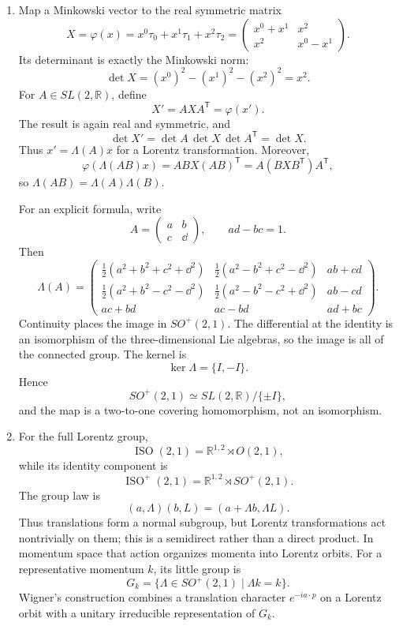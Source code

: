 \begin{enumerate}
\begin{enumerate}
\item[(b)] Map a Minkowski vector to the real symmetric matrix
\[
 X=\varphi(x)=x^0\tau_0+x^1\tau_1+x^2\tau_2
 =\begin{pmatrix}x^0+x^1&x^2\\x^2&x^0-x^1\end{pmatrix}.
\]
Its determinant is exactly the Minkowski norm:
\[
 \det X=(x^0)^2-(x^1)^2-(x^2)^2=x^2.
\]
For \(A\in SL(2,\mathbb R)\), define
\[
 X' = AXA^{\mathsf T}=\varphi(x').
\]
The result is again real and symmetric, and
\[
 \det X'=\det A\,\det X\,\det A^{\mathsf T}=\det X.
\]
Thus \(x'=\Lambda(A)x\) for a Lorentz transformation.  Moreover,
\[
 \varphi(\Lambda(AB)x)=ABX(AB)^{\mathsf T}
 =A(BXB^{\mathsf T})A^{\mathsf T},
\]
so \(\Lambda(AB)=\Lambda(A)\Lambda(B)\).

For an explicit formula, write
\[
 A=\begin{pmatrix}a&b\\c&\dd\end{pmatrix},
 \qquad ad-bc=1.
\]
Then
\[
 \Lambda(A)=
 \begin{pmatrix}
 \frac12(a^2+b^2+c^2+\dd^2)&
 \frac12(a^2-b^2+c^2-\dd^2)&ab+cd\\
 \frac12(a^2+b^2-c^2-\dd^2)&
 \frac12(a^2-b^2-c^2+\dd^2)&ab-cd\\
 ac+bd&ac-bd&ad+bc
 \end{pmatrix}.
\]
Continuity places the image in \(SO^+(2,1)\).  The differential at the
identity is an isomorphism of the three-dimensional Lie algebras, so the
image is all of the connected group.  The kernel is
\[
 \ker\Lambda=\{I,-I\}.
\]
Hence
\[
 SO^+(2,1)\simeq SL(2,\mathbb R)/\{\pm I\},
\]
and the map is a two-to-one covering homomorphism, not an isomorphism.

\item[(c)] For the full Lorentz group,
\[
 \operatorname{ISO}(2,1)=\mathbb R^{1,2}\rtimes O(2,1),
\]
while its identity component is
\[
 \operatorname{ISO}^+(2,1)=\mathbb R^{1,2}\rtimes SO^+(2,1).
\]
The group law is
\[
 (a,\Lambda)(b,L)=(a+\Lambda b,\Lambda L).
\]
Thus translations form a normal subgroup, but Lorentz transformations
act nontrivially on them; this is a semidirect rather than a direct
product.  In momentum space that action organizes momenta into Lorentz
orbits.  For a representative momentum \(k\), its little group is
\[
 G_k=\{\Lambda\in SO^+(2,1)\mid\Lambda k=k\}.
\]
Wigner's construction combines a translation character
\(e^{-ia\cdot p}\) on a Lorentz orbit with a unitary irreducible
representation of \(G_k\).


\end{enumerate}
\end{enumerate}
